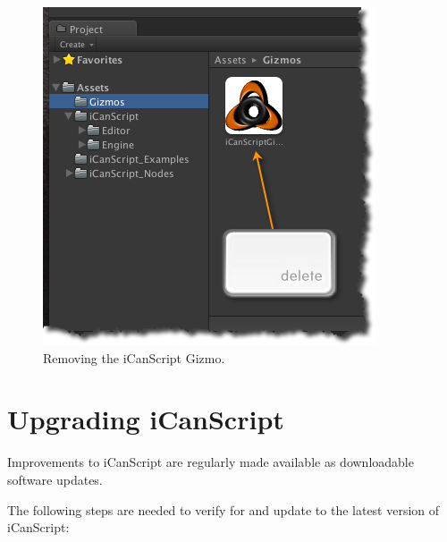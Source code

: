 \begin{figure}[htbp]
\centering
\includegraphics[keepaspectratio,width=\textwidth,height=0.75\textheight]{remove-gizmo.png}
\caption{Removing the iCanScript Gizmo.}
\label{remove-gizmo.png}
\end{figure}

\chapter{Upgrading iCanScript}
\label{upgradingicanscript}

Improvements to iCanScript are regularly made available as downloadable software updates. 

The following steps are needed to verify for and update to the latest version of iCanScript:

